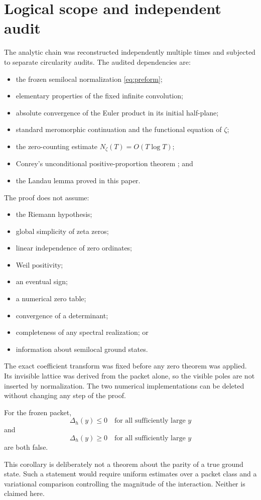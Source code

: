 \section{Logical scope and independent audit}

The analytic chain was reconstructed independently multiple times and
subjected to separate circularity audits.  The audited dependencies are:
\begin{itemize}[leftmargin=2em]
\item the frozen semilocal normalization
      \eqref{eq:preform};
\item elementary properties of the fixed infinite convolution;
\item absolute convergence of the Euler product in its initial half-plane;
\item standard meromorphic continuation and the functional equation of
      \(\zeta\);
\item the zero-counting estimate \(N_\zeta(T)=O(T\log T)\);
\item Conrey's unconditional positive-proportion theorem
      \cite{Conrey1989}; and
\item the Landau lemma proved in this paper.
\end{itemize}

The proof does not assume:
\begin{itemize}[leftmargin=2em]
\item the Riemann hypothesis;
\item global simplicity of zeta zeros;
\item linear independence of zero ordinates;
\item Weil positivity;
\item an eventual sign;
\item a numerical zero table;
\item convergence of a determinant;
\item completeness of any spectral realization; or
\item information about semilocal ground states.
\end{itemize}

The exact coefficient transform was fixed before any zero theorem was
applied.  Its invisible lattice was derived from the packet alone, so the
visible poles are not inserted by normalization.  The two numerical
implementations can be deleted without changing any step of the proof.

\begin{corollary}
For the frozen packet,
\[
\Delta_h(y)\le0\quad\text{for all sufficiently large }y
\]
and
\[
\Delta_h(y)\ge0\quad\text{for all sufficiently large }y
\]
are both false.
\end{corollary}

This corollary is deliberately not a theorem about the parity of a true
ground state.  Such a statement would require uniform estimates over a
packet class and a variational comparison controlling the magnitude of the
interaction.  Neither is claimed here.
